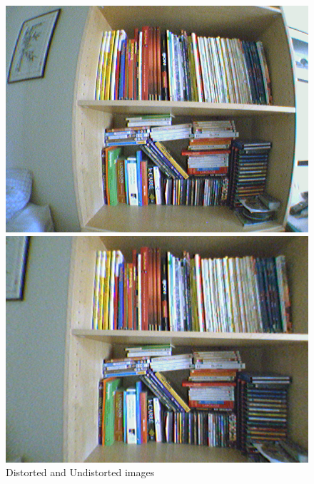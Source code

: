 \documentclass[12pt]{article}
\begin{document}
\begin{figure}[htbp]
    \begin{minipage}[c]{.4\linewidth}
        \begin{center}
            \includegraphics[scale=.3]{images/distorted.png}
        \end{center}
    \end{minipage}
    \hfill
    \begin{minipage}[c]{.4\linewidth}
        \begin{center}
            \includegraphics[scale=.3]{images/undistorted.png}
        \end{center}
    \end{minipage}
    \caption{Distorted and Undistorted images}
    \label{fig:distorted-undistorted}
\end{figure}
\end{document}
